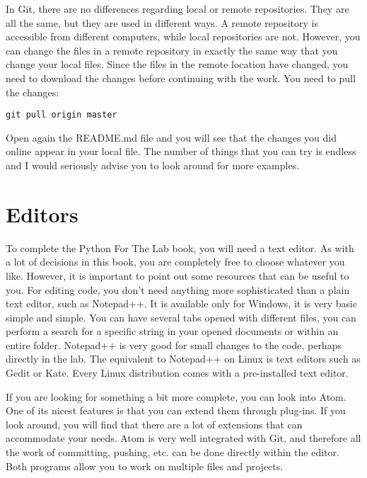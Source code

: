In Git, there are no differences regarding local or remote repositories. They are all the same, but they are used in different ways. A remote repository is accessible from different computers, while local repositories are not. However, you can change the files in a remote repository in exactly the same way that you change your local files. Since the files in the remote location have changed, you need to download the changes before continuing with the work. You need to pull the changes:

\begin{verbatim}
git pull origin master
\end{verbatim}

Open again the README.md file and you will see that the changes you did online appear in your local file. The number of things that you can try is endless and I would seriously advise you to look around for more examples.


\section{Editors}
To complete the Python For The Lab book, you will need a text editor. As with a lot of decisions in this book, you are completely free to choose whatever you like. However, it is important to point out some resources that can be useful to you. For editing code, you don’t need anything more sophisticated than a plain text editor, such as Notepad++. It is available only for Windows, it is very basic simple and simple. You can have several tabs opened with different files, you can perform a search for a specific string in your opened documents or within an entire folder. Notepad++ is very good for small changes to the code, perhaps directly in the lab. The equivalent to Notepad++ on Linux is text editors such as Gedit or Kate. Every Linux distribution comes with a pre-installed text editor.

If you are looking for something a bit more complete, you can look into Atom. One of its nicest features is that you can extend them through plug-ins. If you look around, you will find that there are a lot of extensions that can accommodate your needs. Atom is very well integrated with Git, and therefore all the work of committing, pushing, etc. can be done directly within the editor. Both programs allow you to work on multiple files and projects.

